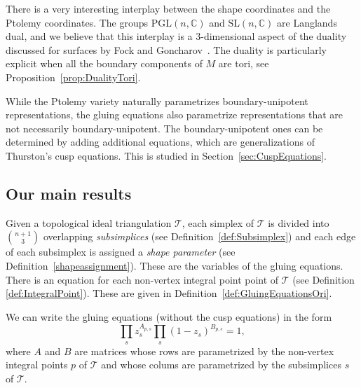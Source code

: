 \documentclass[12pt]{amsart}
\newtheorem{theorem}{Theorem}[section]
\theoremstyle{definition}
\numberwithin{equation}{section}
\def\SL{\mathrm{SL}}
\def\PGL{\mathrm{PGL}}
\def\CT{\mathcal T}
\def\Z{\mathbb{Z}}
\def\C{\mathbb{C}}
\def\T{\mathcal{T}}
\begin{document}
There is a very interesting interplay between the shape coordinates and the Ptolemy coordinates. The groups $\PGL(n,\C)$ and $\SL(n,\C)$ are Langlands dual, and we believe that this interplay is a 3-dimensional aspect of the duality discussed for surfaces by Fock and Goncharov~\cite[p.~33]{FockGoncharov}. The duality is particularly explicit when all the boundary components of $M$ are tori, see Proposition~\ref{prop:DualityTori}.

While the Ptolemy variety naturally parametrizes boundary-unipotent representations, the gluing equations also parametrize representations that are not necessarily boundary-unipotent. The boundary-unipotent ones can be determined by adding additional equations, which are generalizations of Thurston's cusp equations. This is studied in Section~\ref{sec:CuspEquations}.

\subsection{Our main results}
\label{sub.results}
Given a topological ideal triangulation $\CT$, each simplex of $\T$ is divided into $\binom{n+1}{3}$ overlapping \emph{subsimplices} (see Definition~\ref{def:Subsimplex}) and each edge of each subsimplex is assigned a \emph{shape parameter} (see Definition~\ref{shapeassignment}). These are the variables of the gluing equations. There is an equation for each non-vertex integral point 
point of $\T$ (see Definition \ref{def:IntegralPoint}). These are given in Definition~\ref{def:GluingEquationsOri}.

We can write the gluing equations (without the cusp equations) in the form
\begin{equation}\label{eq:GluinEqSimplified}
\prod_s z_s^{A_{p,s}}\prod_s(1-z_s)^{B_{p,s}}=1,
\end{equation}
where $A$ and $B$ are matrices whose rows are parametrized by the non-vertex integral points $p$ of $\T$ and whose colums are parametrized by the subsimplices $s$ of $\T$.
\end{document}
